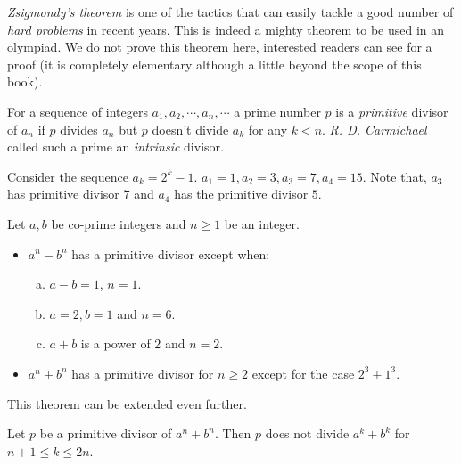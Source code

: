 \documentclass{subfile}
\begin{document}
	\textit{Zsigmondy's theorem} is one of the tactics that can easily tackle a good number of \textit{hard problems} in recent years. This is indeed a mighty theorem to be used in an olympiad. We do not prove this theorem here, interested readers can see \textcite[$\S6.2$]{billal_riasat_2021} for a proof (it is completely elementary although a little beyond the scope of this book).
		\begin{definition}
			For a sequence of integers $a_1,a_2,\cdots,a_n,\cdots$ a prime number $p$ is a \textit{primitive} divisor of $a_n$ if $p$ divides $a_n$ but $p$ doesn't divide $a_k$ for any $k<n$. \textit{R. D. Carmichael} called such a prime an \textit{intrinsic} divisor.
		\end{definition}

		\begin{example}
			Consider the sequence $a_k=2^k-1$. $a_1=1,a_2=3,a_3=7,a_4=15$. Note that, $a_3$ has primitive divisor $7$ and $a_4$ has the primitive divisor $5$.
		\end{example}

		\begin{theorem}
			Let $a,b$ be co-prime integers and $n\geq1$ be an integer.
				\begin{itemize}
					\item $a^n-b^n$ has a primitive divisor except when:
						\begin{enumerate}[(a)]
							\item $a-b=1$, $n=1$.
							\item $a=2,b=1$ and $n=6$.
							\item $a+b$ is a power of $2$ and $n=2$.
						\end{enumerate}
					\item $a^n+b^n$ has a primitive divisor for $n\geq2$ except for the case $2^3+1^3$.
				\end{itemize}\label{thm:zsigmondy}
		\end{theorem}
	This theorem can be extended even further.
		\begin{theorem}
			Let $p$ be a primitive divisor of $a^n+b^n$. Then $p$ does not divide $a^k+b^k$ for $n+1\leq k\leq2n$.
		\end{theorem}
\end{document}
